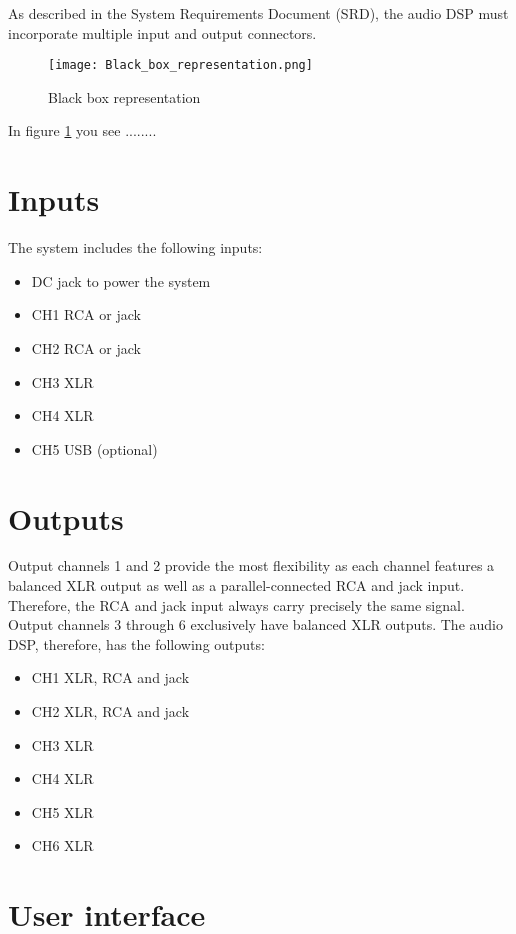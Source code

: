 As described in the System Requirements Document (SRD), the audio DSP must incorporate multiple input and output connectors. 

\begin{figure}[ht]
    \texttt{[image: Black\_box\_representation.png]}
    \caption{Black box representation}
    \label{fig:Black-box-rep}
\end{figure}

In figure \ref{fig:Black-box-rep} you see ........

\section{Inputs}
The system includes the following inputs:
\begin{itemize}
    \item DC jack to power the system
    \item CH1 RCA or jack
    \item CH2 RCA or jack
    \item CH3 XLR
    \item CH4 XLR
    \item CH5 USB (optional)
\end{itemize}

\section{Outputs}
Output channels 1 and 2 provide the most flexibility as each channel features a balanced XLR output as well as a parallel-connected RCA and jack input. Therefore, the RCA and jack input always carry precisely the same signal. Output channels 3 through 6 exclusively have balanced XLR outputs. The audio DSP, therefore, has the following outputs:

\begin{itemize}
    \item CH1 XLR, RCA and jack
    \item CH2 XLR, RCA and jack
    \item CH3 XLR
    \item CH4 XLR
    \item CH5 XLR
    \item CH6 XLR
\end{itemize}

\section{User interface}
